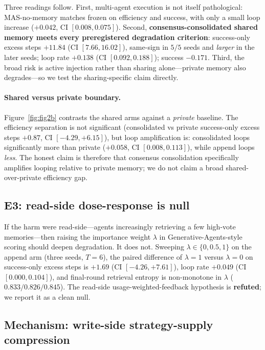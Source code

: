 \documentclass[11pt]{article}
\begin{document}
Three readings follow. First, multi-agent execution is not itself pathological: MAS-no-memory
matches frozen on efficiency and success, with only a small loop increase
($+0.042$, CI $[0.008, 0.075]$). Second, \textbf{consensus-consolidated shared memory meets every
preregistered degradation criterion}: success-only excess steps $+11.84$ (CI $[7.66, 16.02]$),
same-sign in $5/5$ seeds and \emph{larger} in the later seeds; loop rate $+0.138$
(CI $[0.092, 0.188]$); success $-0.171$. Third, the broad risk is active injection rather than
sharing alone---private memory also degrades---so we test the sharing-specific claim directly.

\paragraph{Shared versus private boundary.} Figure~\ref{fig:fig2b} contrasts the shared arms
against a \emph{private} baseline. The efficiency separation is not significant
(consolidated vs private success-only excess steps $+0.87$, CI $[-4.29, +6.15]$), but loop
amplification is: consolidated loops significantly more than private ($+0.058$,
CI $[0.008, 0.113]$), while append loops \emph{less}. The honest claim is therefore that
consensus consolidation specifically amplifies looping relative to private memory; we do not
claim a broad shared-over-private efficiency gap.

\subsection{E3: read-side dose-response is null}

If the harm were read-side---agents increasingly retrieving a few high-vote memories---then
raising the importance weight $\lambda$ in Generative-Agents-style scoring should deepen
degradation. It does not. Sweeping $\lambda\in\{0,0.5,1\}$ on the append arm (three seeds,
$T=6$), the paired difference of $\lambda{=}1$ versus $\lambda{=}0$ on success-only excess steps
is $+1.69$ (CI $[-4.26, +7.61]$), loop rate $+0.049$ (CI $[0.000, 0.104]$), and final-round
retrieval entropy is non-monotone in $\lambda$ ($0.833/0.826/0.845$). The read-side
usage-weighted-feedback hypothesis is \textbf{refuted}; we report it as a clean null.

\subsection{Mechanism: write-side strategy-supply compression}
\end{document}
